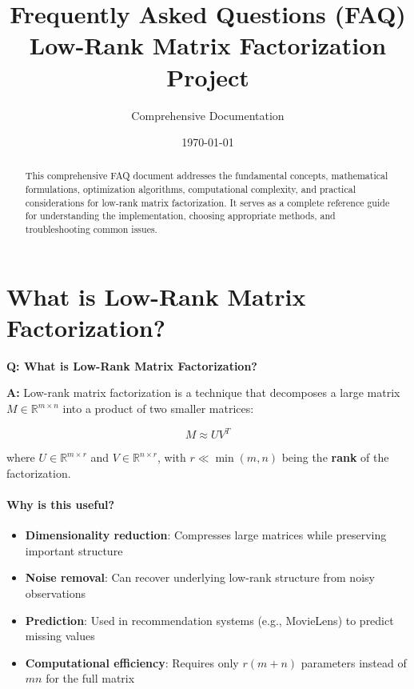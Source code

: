 \documentclass[11pt,oneside]{article}
\title{\Large\textbf{Frequently Asked Questions (FAQ)}\\\Large Low-Rank Matrix Factorization Project}
\author{Comprehensive Documentation}
\date{\today}
\newcommand{\defn}[1]{\textbf{#1}}
\newcommand{\Real}{\mathbb{R}}
\newcommand{\question}[1]{\textbf{Q: #1}}
\newcommand{\answer}{\textbf{A: }}
\begin{document}
\maketitle

\begin{abstract}
This comprehensive FAQ document addresses the fundamental concepts, mathematical formulations, optimization algorithms, computational complexity, and practical considerations for low-rank matrix factorization. It serves as a complete reference guide for understanding the implementation, choosing appropriate methods, and troubleshooting common issues.
\end{abstract}

\tableofcontents
\newpage

\section{What is Low-Rank Matrix Factorization?}\label{sec:intro}

\question{What is Low-Rank Matrix Factorization?}

\answer Low-rank matrix factorization is a technique that decomposes a large matrix $M \in \Real^{m \times n}$ into a product of two smaller matrices:

\begin{equation}
    M \approx U V^T
\end{equation}

where $U \in \Real^{m \times r}$ and $V \in \Real^{n \times r}$, with $r \ll \min(m, n)$ being the \defn{rank} of the factorization.

\paragraph{Why is this useful?}

\begin{itemize}
    \item \textbf{Dimensionality reduction}: Compresses large matrices while preserving important structure
    \item \textbf{Noise removal}: Can recover underlying low-rank structure from noisy observations
    \item \textbf{Prediction}: Used in recommendation systems (e.g., MovieLens) to predict missing values
    \item \textbf{Computational efficiency}: Requires only $r(m + n)$ parameters instead of $mn$ for the full matrix
\end{itemize}
\end{document}
